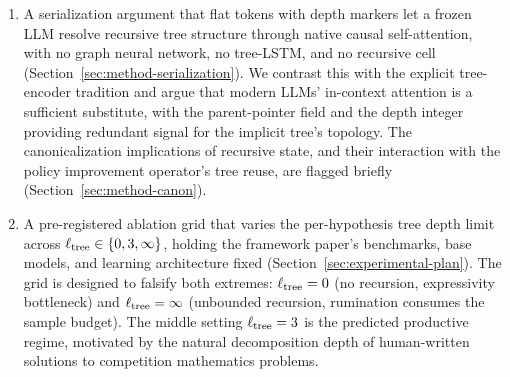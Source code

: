 \begin{enumerate}[leftmargin=*]
        nodes stays at seven (or fewer, after availability masking),
        and the fixed action-set assumption underlying both $\Qpsi$
        and PUCT-style policy improvement is preserved without
        progressive widening machinery.
  \item A serialization argument that flat tokens with depth markers
        let a frozen LLM resolve recursive tree structure through
        native causal self-attention, with no graph neural network,
        no tree-LSTM, and no recursive cell
        (Section~\ref{sec:method-serialization}). We contrast this
        with the explicit tree-encoder tradition
        \citep{socher2013recursive, tai2015improved,
        velickovic2018gat} and argue that modern LLMs' in-context
        attention is a sufficient substitute, with the
        parent-pointer field and the depth integer providing
        redundant signal for the implicit tree's topology. The
        canonicalization implications of recursive state, and their
        interaction with the policy improvement operator's tree
        reuse, are flagged briefly (Section~\ref{sec:method-canon}).
  \item A pre-registered ablation grid that varies the per-hypothesis
        tree depth limit across
        $\ell_{\mathrm{tree}} \in \{0, 3, \infty\}$, holding the framework
        paper's benchmarks, base models, and learning architecture
        fixed (Section~\ref{sec:experimental-plan}). The grid is
        designed to falsify both extremes: $\ell_{\mathrm{tree}} = 0$ (no
        recursion, expressivity bottleneck) and
        $\ell_{\mathrm{tree}} = \infty$ (unbounded recursion, rumination
        consumes the sample budget). The middle setting
        $\ell_{\mathrm{tree}} = 3$ is the predicted productive regime,
        motivated by the natural decomposition depth of
        human-written solutions to competition mathematics
        problems.
\end{enumerate}

